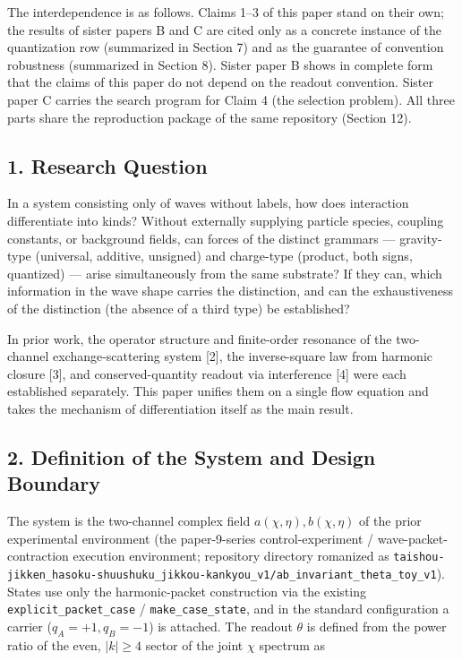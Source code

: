 \documentclass[
  a4paper,
]{article}
\begin{document}
The interdependence is as follows. Claims 1--3 of this paper stand on
their own; the results of sister papers B and C are cited only as a
concrete instance of the quantization row (summarized in Section 7) and
as the guarantee of convention robustness (summarized in Section 8).
Sister paper B shows in complete form that the claims of this paper do
not depend on the readout convention. Sister paper C carries the search
program for Claim 4 (the selection problem). All three parts share the
reproduction package of the same repository (Section 12).

\subsection{1. Research Question}\label{research-question}

In a system consisting only of waves without labels, how does
interaction differentiate into kinds? Without externally supplying
particle species, coupling constants, or background fields, can forces
of the distinct grammars --- gravity-type (universal, additive,
unsigned) and charge-type (product, both signs, quantized) --- arise
simultaneously from the same substrate? If they can, which information
in the wave shape carries the distinction, and can the exhaustiveness of
the distinction (the absence of a third type) be established?

In prior work, the operator structure and finite-order resonance of the
two-channel exchange-scattering system {[}2{]}, the inverse-square law
from harmonic closure {[}3{]}, and conserved-quantity readout via
interference {[}4{]} were each established separately. This paper
unifies them on a single flow equation and takes the mechanism of
differentiation itself as the main result.

\subsection{2. Definition of the System and Design
Boundary}\label{definition-of-the-system-and-design-boundary}

The system is the two-channel complex field
\(a(\chi,\eta), b(\chi,\eta)\) of the prior experimental environment
(the paper-9-series control-experiment / wave-packet-contraction
execution environment; repository directory romanized as
\texttt{taishou-jikken\_hasoku-shuushuku\_jikkou-kankyou\_v1/ab\_invariant\_theta\_toy\_v1}).
States use only the harmonic-packet construction via the existing
\texttt{explicit\_packet\_case} / \texttt{make\_case\_state}, and in the
standard configuration a carrier (\(q_A=+1, q_B=-1\)) is attached. The
readout \(\theta\) is defined from the power ratio of the even,
\(|k|\ge4\) sector of the joint \(\chi\) spectrum as
\end{document}
